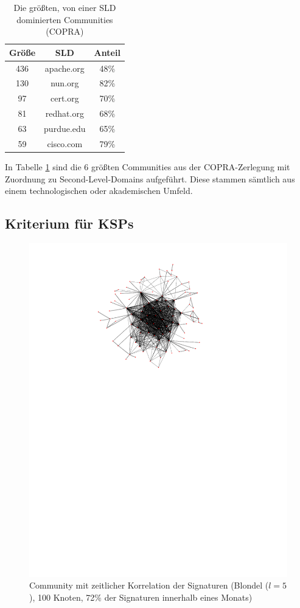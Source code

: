 \begin{table}
  \centering
  \begin{tabular}{c|c|c}
    Größe & SLD & Anteil \\
    \hline
    436 & apache.org & 48\% \\
    130 & nun.org & 82\% \\
    97 & cert.org & 70\% \\
    81 & redhat.org & 68\% \\
    63 & purdue.edu & 65\% \\
    59 & cisco.com & 79\% 
  \end{tabular}
  \caption{Die größten, von einer SLD dominierten Communities
    (COPRA)}
  \label{tab:ass-examples}
\end{table}
In Tabelle \ref{tab:ass-examples} sind die 6 größten Communities
aus der COPRA-Zerlegung mit Zuordnung zu Second-Level-Domains
aufgeführt. Diese stammen sämtlich aus einem technologischen oder
akademischen Umfeld.

\subsection{Kriterium für KSPs}
\label{sec:kriterium-fur-ksps}

\begin{figure}[th!]
  \centering
  \includegraphics[scale=1.5]{images/subgraph-label-time-fa62cc57cd35e9f90b85435efc407ad5.pdf}
  \caption{Community mit zeitlicher Korrelation der Signaturen
    (Blondel ($l=5$),
    100 Knoten, 72\% der Signaturen innerhalb eines Monats)}
  \label{fig:time-corr-com-normal}
\end{figure}

